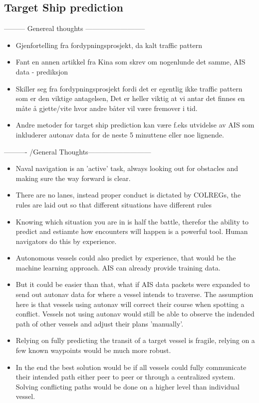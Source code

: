 \subsection{Target Ship prediction}
--------- Genereal thoughts --------------------------
\begin{itemize}
    \item Gjenfortelling fra fordypningsprosjekt, da kalt traffic pattern
    \item Fant en annen artikkel fra Kina som skrev om nogenlunde det samme, \gls{AIS} data -\> prediksjon
    \item Skiller seg fra fordypningsprosjekt fordi det er egentlig ikke traffic pattern som er den viktige antagelsen,
    Det er heller viktig at vi antar det finnes en måte å gjette/vite hvor andre båter vil være fremover i tid.
    \item Andre metoder for target ship prediction kan være f.eks utvidelse av \gls{AIS} som 
    inkluderer autonav data for de neste 5 minuttene eller noe lignende.
\end{itemize}
---------- /General Thoughts--------------------------- 
\begin{itemize}
    \item Naval navigation is an 'active' task, always looking out for obstacles and making sure the way forward is clear.
    \item There are no lanes, instead proper conduct is dictated by \gls{COLREGs}, the rules are laid out so that different situations
    have different rules
    \item Knowing which situation you are in is half the battle, therefor the ability to predict and estiamte how encounters will happen
    is a powerful tool. Human navigators do this by experience.
    \item Autonomous vessels could also predict by experience, that would be the machine learning approach. \gls{AIS} can already provide training data.
    \item But it could be easier than that, what if \gls{AIS} data packets were expanded to send out autonav data for where a vessel intends to traverse.
    The assumption here is that vessels using autonav will correct their course when spotting a conflict. Vessels not using autonav would still be able to observe
    the indended path of other vessels and adjust their plans 'manually'.
    \item Relying on fully predicting the transit of a target vessel is fragile, relying on a few known waypoints would be much more robust.
    \item In the end the best solution would be if all vessels could fully communicate their intended path either peer to peer or through
    a centralized system. Solving conflicting paths would be done on a higher level than individual vessel.
\end{itemize}

